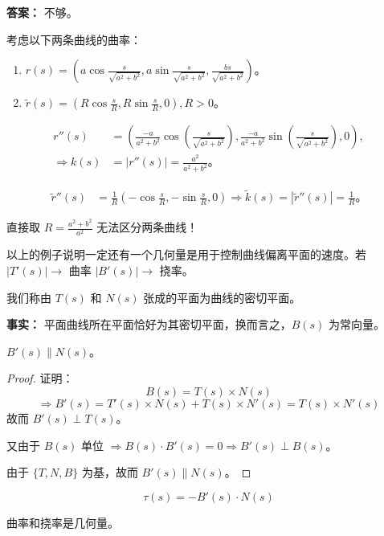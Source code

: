 \documentclass[lang=cn,10pt,thmcnt=section]{elegantbook}
\begin{document}
    \textbf{答案：} 不够。
    
    \begin{example}[两条曲线的曲率]
    考虑以下两条曲线的曲率：
    \begin{enumerate}
        \item $r(s) = \left( a \cos \frac{s}{\sqrt{a^2 + b^2}}, a \sin \frac{s}{\sqrt{a^2 + b^2}}, \frac{b s}{\sqrt{a^2 + b^2}} \right)$。
        \item $\tilde{r}(s) = \left( R \cos \frac{s}{R}, R \sin \frac{s}{R}, 0 \right), R > 0$。
    \end{enumerate}
    \end{example}
    
    \begin{align*}
    r''(s) &= \left( \frac{-a}{a^2 + b^2} \cos \left( \frac{s}{\sqrt{a^2 + b^2}} \right), \frac{-a}{a^2 + b^2} \sin \left( \frac{s}{\sqrt{a^2 + b^2}} \right), 0 \right), \\
    \Rightarrow k(s) &= |r''(s)| = \frac{a^2}{a^2 + b^2}。
    \end{align*}
    
    \begin{align*}
    \tilde{r}''(s) &= \frac{1}{R} \left( -\cos \frac{s}{R}, -\sin \frac{s}{R}, 0 \right) \Rightarrow \tilde{k}(s) = |\tilde{r}''(s)| = \frac{1}{R}。
    \end{align*}
    
$\text{直接取 } R = \frac{a^2 + b^2}{a^2} \text{ 无法区分两条曲线！}$

    以上的例子说明一定还有一个几何量是用于控制曲线偏离平面的速度。若 $|T'(s)| \rightarrow$ 曲率 $|B'(s)| \rightarrow$ 挠率。

    \begin{definition}[密切平面]
    我们称由 $T(s)$ 和 $N(s)$ 张成的平面为曲线的密切平面。
    \end{definition}
    
    \textbf{事实：} 平面曲线所在平面恰好为其密切平面，换而言之，$B(s)$ 为常向量。
\begin{proposition}
        \label{prop:B'N}
        $B'(s) \parallel N(s)$。
\end{proposition}
        
        \begin{proof}
        证明：
        \[
        B(s) = T(s) \times N(s)
        \]
        \[
        \Rightarrow B'(s) = T'(s) \times N(s) + T(s) \times N'(s) = T(s) \times N'(s)
        \]
        故而 $B'(s) \perp T(s)$。
        
        又由于 $B(s)$ 单位 $\Rightarrow B(s) \cdot B'(s) = 0 \Rightarrow B'(s) \perp B(s)$。
        
        由于 $\{T, N, B\}$ 为基，故而 $B'(s) \parallel N(s)$。
\end{proof}
\begin{definition}[挠率]
    \[
    \tau(s) = -B'(s) \cdot N(s)
    \]
\end{definition}
\begin{proposition}
    曲率和挠率是几何量。
    \end{proposition}
    
\end{document}
